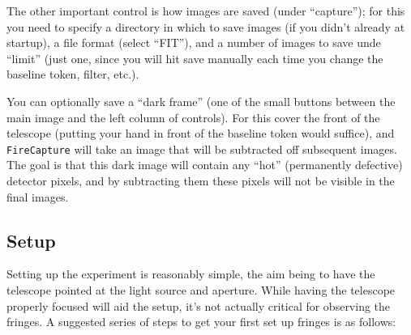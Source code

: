 \documentclass[11pt]{article}
\begin{document}
The other important control is how images are saved (under ``capture''); for this you need to specify a directory in which to save images (if you didn't already at startup), a file format (select ``FIT''), and a number of images to save unde ``limit'' (just one, since you will hit save manually each time you change the baseline token, filter, etc.).

You can optionally save a ``dark frame'' (one of the small buttons between the main image and the left column of controls). For this cover the front of the telescope (putting your hand in front of the baseline token would suffice), and \texttt{FireCapture} will take an image that will be subtracted off subsequent images. The goal is that this dark image will contain any ``hot'' (permanently defective) detector pixels, and by subtracting them these pixels will not be visible in the final images.

\subsection{Setup}

Setting up the experiment is reasonably simple, the aim being to have the telescope pointed at the light source and aperture. While having the telescope properly focused will aid the setup, it's not actually critical for observing the fringes. A suggested series of steps to get your first set up fringes is as follows:
\end{document}
